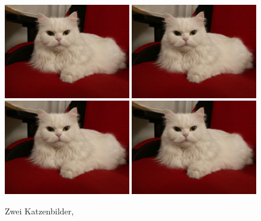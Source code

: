\documentclass[12pt,ngerman,parskip=half]{scrreprt}
\begin{document}
\begin{figure}
\centering
{}
{\includegraphics[width=0.49\textwidth]{Bilder/Katze}}
{\includegraphics[width=0.49\textwidth]{Bilder/Katze}}
{\includegraphics[width=0.49\textwidth]{Bilder/Katze}}
{\includegraphics[width=0.49\textwidth]{Bilder/Katze}}
\caption{Zwei Katzenbilder, \blindtext[1]}\label{katzenbilder}
\end{figure}
\end{document}
